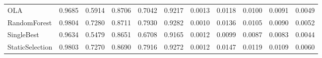 \begin{table}[h!]
\begin{tabular}{l|l|l|l|l|l|l|l|l|l|l}
                        OLA &    0.9685 &     0.5914 &  0.8706 &    0.7042 &   0.9217 &        0.0013 &         0.0118 &      0.0100 &        0.0091 &       0.0049 \\
               RandomForest &    0.9804 &     0.7280 &  0.8711 &    0.7930 &   0.9282 &        0.0010 &         0.0136 &      0.0105 &        0.0090 &       0.0052 \\
                 SingleBest &    0.9634 &     0.5479 &  0.8651 &    0.6708 &   0.9165 &        0.0012 &         0.0099 &      0.0087 &        0.0083 &       0.0044 \\
            StaticSelection &    0.9803 &     0.7270 &  0.8690 &    0.7916 &   0.9272 &        0.0012 &         0.0147 &      0.0119 &        0.0109 &       0.0060 \\
\bottomrule
\end{tabular}

\end{table}
